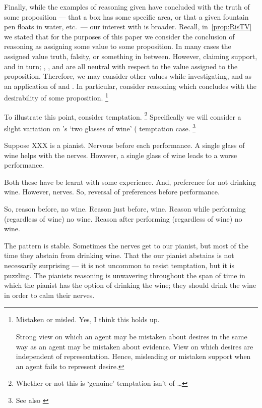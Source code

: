 \begin{note}[Examples]
  \color{red}
  Finally, while the examples of reasoning given have concluded with the truth of some proposition --- that a box has some specific area, or that a given fountain pen floats in water, etc.\ --- our interest with \EAS{} is broader.
  Recall, in~\autoref{prop:RisTV} we stated that for the purposes of this paper we consider the conclusion of reasoning as assigning some value to some proposition.
  In many cases the assigned value truth, falsity, or something in between.
  However, claiming support, and in turn; \USE{}, \ESU{}, and \EAS{} are all neutral with respect to the value assigned to the proposition.
  Therefore, we may consider other values while investigating, and as an application of \ESU{} and \EAS{}.
  In particular, consider reasoning which concludes with the desirability of some proposition.\nolinebreak
  \footnote{
    \color{red}
    Mistaken or misled.
    Yes, I think this holds up.

    Strong view on which an agent may be mistaken about desires in the same way as an agent may be mistaken about evidence.
    View on which desires are independent of representation.
    Hence, misleading or mistaken support when an agent fails to represent desire.
  }

  To illustrate this point, consider temptation.\nolinebreak
  \footnote{
    \color{red}
    Whether or not this is `genuine' temptation isn't of \dots
  }
  Specifically we will consider a slight variation on \citeauthor{Bratman:1999ac}'s `two glasses of wine' (\citeyear[38]{Bratman:1999ac} temptation case.\nolinebreak
  \footnote{
    \color{red}
    See also \cite{Bratman:2007ab}
  }

  Suppose XXX is a pianist.
  Nervous before each performance.
  A single glass of wine helps with the nerves.
  However, a single glass of wine leads to a worse performance.

  Both these have be learnt with some experience.
  And, preference for not drinking wine.
  However, nerves.
  So, reversal of preferences before performance.

  So, reason before, no wine.
  Reason just before, wine.
  Reason while performing (regardless of wine) no wine.
  Reason after performing (regardless of wine) no wine.

  The pattern is stable.
  Sometimes the nerves get to our pianist, but most of the time they abstain from drinking wine.
  That the our pianist abstains is not necessarily surprising --- it is not uncommon to resist temptation, but it is puzzling.
  The pianists reasoning is unwavering throughout the span of time in which the pianist has the option of drinking the wine; they should drink the wine in order to calm their nerves.


\end{note}
